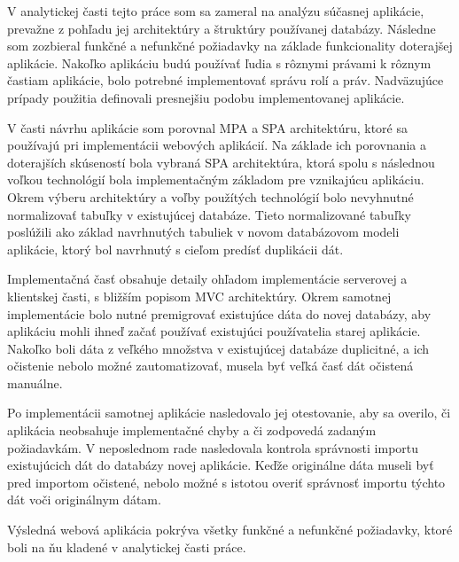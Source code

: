 \begin{conclusion}
V analytickej časti tejto práce som sa zameral na analýzu súčasnej aplikácie, prevažne z pohľadu jej architektúry a štruktúry používanej databázy. Následne som zozbieral funkčné a nefunkčné požiadavky na základe funkcionality doterajšej aplikácie. Nakoľko aplikáciu budú používať ľudia s rôznymi právami k rôznym častiam aplikácie, bolo potrebné implementovať správu rolí a práv. Nadväzujúce prípady použitia definovali presnejšiu podobu implementovanej aplikácie.

V časti návrhu aplikácie som porovnal MPA a SPA architektúru, ktoré sa používajú pri implementácii webových aplikácií. Na základe ich porovnania a doterajších skúseností bola vybraná SPA architektúra, ktorá spolu s následnou voľkou technológií bola implementačným základom pre vznikajúcu aplikáciu. Okrem výberu architektúry a voľby použítých technológií bolo nevyhnutné normalizovať tabuľky v existujúcej databáze. Tieto normalizované tabuľky poslúžili ako základ navrhnutých tabuliek v novom databázovom modeli aplikácie, ktorý bol navrhnutý s cieľom predísť duplikácii dát.

Implementačná časť obsahuje detaily ohľadom implementácie serverovej a klientskej časti, s bližším popisom MVC architektúry.
Okrem samotnej implementácie bolo nutné premigrovať existujúce dáta do novej databázy, aby aplikáciu mohli ihneď začať používať existujúci používatelia starej aplikácie. Nakoľko boli dáta z veľkého množstva v existujúcej databáze duplicitné, a ich očistenie nebolo možné zautomatizovať, musela byť veľká časť dát očistená manuálne.

Po implementácii samotnej aplikácie nasledovalo jej otestovanie, aby sa overilo, či aplikácia neobsahuje implementačné chyby a či zodpovedá zadaným požiadavkám. V neposlednom rade nasledovala kontrola správnosti importu existujúcich dát do databázy novej aplikácie. Keďže originálne dáta museli byť pred importom očistené, nebolo možné s istotou overiť správnosť importu týchto dát voči originálnym dátam.

Výsledná webová aplikácia pokrýva všetky funkčné a nefunkčné požiadavky, ktoré boli na ňu kladené v analytickej časti práce.
\end{conclusion}